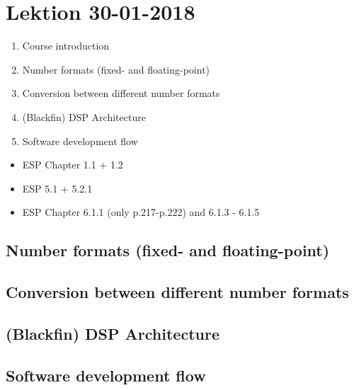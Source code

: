\section{Lektion 30-01-2018}

\begin{enumerate}
	\item Course introduction
	\item Number formats (fixed- and floating-point)
	\item Conversion between different number formats
	\item (Blackfin) DSP Architecture
	\item Software development flow
\end{enumerate}

\begin{mdframed}[style=exampledefault]
\begin{itemize}
	\item ESP Chapter 1.1 + 1.2
	\item ESP 5.1 + 5.2.1
	\item ESP Chapter 6.1.1 (only p.217-p.222) and 6.1.3 - 6.1.5
\end{itemize}
\end{mdframed}

\subsection{Number formats (fixed- and floating-point)}

\subsection{Conversion between different number formats}

\subsection{(Blackfin) DSP Architecture}

\subsection{Software development flow}